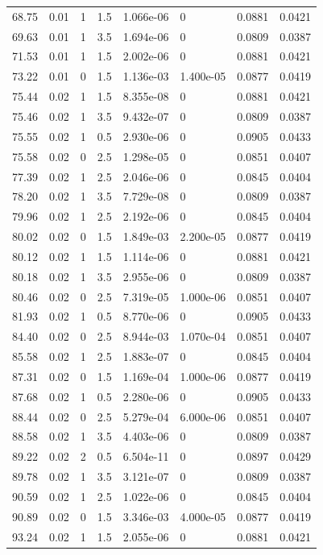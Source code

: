 \documentclass[preview]{standalone}
\begin{document}
{{{\begin{tabular}{L{1.2cm}C{1.2cm} C{0.3cm}C{0.5cm} C{1.4cm}C{1.4cm} C{1.4cm}C{1.4cm}}
  68.75  &  0.01  & 1     & 1.5 &  1.066e-06  & 0  & 0.0881 &  0.0421   \\ 
  69.63  &  0.01  & 1     & 3.5 &  1.694e-06  & 0  & 0.0809 &  0.0387   \\ 
  71.53  &  0.01  & 1     & 1.5 &  2.002e-06  & 0  & 0.0881 &  0.0421   \\ 
  73.22  &  0.01  & 0     & 1.5 &  1.136e-03  & 1.400e-05  & 0.0877 &  0.0419   \\ 
  75.44  &  0.02  & 1     & 1.5 &  8.355e-08  & 0  & 0.0881 &  0.0421   \\ 
  75.46  &  0.02  & 1     & 3.5 &  9.432e-07  & 0  & 0.0809 &  0.0387   \\ 
  75.55  &  0.02  & 1     & 0.5 &  2.930e-06  & 0  & 0.0905 &  0.0433   \\ 
  75.58  &  0.02  & 0     & 2.5 &  1.298e-05  & 0  & 0.0851 &  0.0407   \\ 
  77.39  &  0.02  & 1     & 2.5 &  2.046e-06  & 0  & 0.0845 &  0.0404   \\ 
  78.20  &  0.02  & 1     & 3.5 &  7.729e-08  & 0  & 0.0809 &  0.0387   \\ 
  79.96  &  0.02  & 1     & 2.5 &  2.192e-06  & 0  & 0.0845 &  0.0404   \\ 
  80.02  &  0.02  & 0     & 1.5 &  1.849e-03  & 2.200e-05  & 0.0877 &  0.0419   \\ 
  80.12  &  0.02  & 1     & 1.5 &  1.114e-06  & 0  & 0.0881 &  0.0421   \\ 
  80.18  &  0.02  & 1     & 3.5 &  2.955e-06  & 0  & 0.0809 &  0.0387   \\ 
  80.46  &  0.02  & 0     & 2.5 &  7.319e-05  & 1.000e-06  & 0.0851 &  0.0407   \\ 
  81.93  &  0.02  & 1     & 0.5 &  8.770e-06  & 0  & 0.0905 &  0.0433   \\ 
  84.40  &  0.02  & 0     & 2.5 &  8.944e-03  & 1.070e-04  & 0.0851 &  0.0407   \\ 
  85.58  &  0.02  & 1     & 2.5 &  1.883e-07  & 0  & 0.0845 &  0.0404   \\ 
  87.31  &  0.02  & 0     & 1.5 &  1.169e-04  & 1.000e-06  & 0.0877 &  0.0419   \\ 
  87.68  &  0.02  & 1     & 0.5 &  2.280e-06  & 0  & 0.0905 &  0.0433   \\ 
  88.44  &  0.02  & 0     & 2.5 &  5.279e-04  & 6.000e-06  & 0.0851 &  0.0407   \\ 
  88.58  &  0.02  & 1     & 3.5 &  4.403e-06  & 0  & 0.0809 &  0.0387   \\ 
  89.22  &  0.02  & 2     & 0.5 &  6.504e-11  & 0  & 0.0897 &  0.0429   \\ 
  89.78  &  0.02  & 1     & 3.5 &  3.121e-07  & 0  & 0.0809 &  0.0387   \\ 
  90.59  &  0.02  & 1     & 2.5 &  1.022e-06  & 0  & 0.0845 &  0.0404   \\ 
  90.89  &  0.02  & 0     & 1.5 &  3.346e-03  & 4.000e-05  & 0.0877 &  0.0419   \\ 
  93.24  &  0.02  & 1     & 1.5 &  2.055e-06  & 0  & 0.0881 &  0.0421   \\ 
\hline 
\end{tabular} 

}}}
\end{document}
